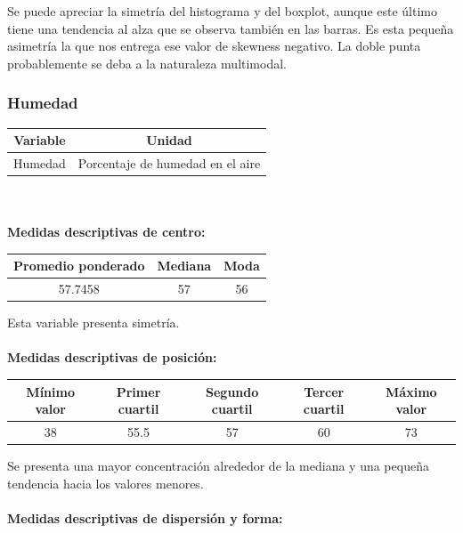 \documentclass[11pt]{article}
\begin{document}
Se puede apreciar la simetría del histograma y del boxplot, aunque este último tiene una tendencia al alza que se observa también en las barras. Es esta pequeña asimetría la que nos entrega ese valor de skewness negativo. La doble punta probablemente se deba a la naturaleza multimodal.

\subsubsection{Humedad}

\begin{center}
\begin{tabular}{|c|c|}
    \hline
    Variable & Unidad  \\ \hline
    Humedad & Porcentaje de humedad en el aire \\
    \hline
\end{tabular}
\end{center}
\\
\\

\textbf{Medidas descriptivas de centro:}

\begin{center}
\begin{tabular}{|c|c|c|}
    \hline
    Promedio ponderado & Mediana & Moda \\ \hline
    57.7458  & 57 & 56 \\
    \hline
\end{tabular}
\end{center}

Esta variable presenta simetría.
\\
\\
\textbf{Medidas descriptivas de posición:}

\begin{center}
\begin{tabular}{|c|c|c|c|c|}
    \hline
    Mínimo valor & Primer cuartil & Segundo cuartil & Tercer cuartil & Máximo valor\\ \hline
    38 & 55.5 & 57 & 60 & 73\\
    \hline
\end{tabular}
\end{center}

Se presenta una mayor concentración alrededor de la mediana y una pequeña tendencia hacia los valores menores.
\\
\\
\textbf{Medidas descriptivas de dispersión y forma:}
\end{document}
